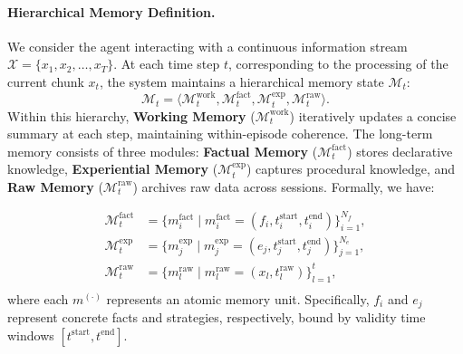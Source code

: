 \documentclass[11pt, a4paper]{lumia}
\begin{document}
\paragraph{Hierarchical Memory Definition.}
We consider the agent interacting with a continuous information stream $\mathcal{X} = \{x_1, x_2, \dots, x_T\}$. 
At each time step $t$, corresponding to the processing of the current chunk $x_t$, the system maintains a hierarchical memory state $\mathcal{M}_t$:
\begin{equation}
\mathcal{M}_t = \langle \mathcal{M}^{\text{work}}_t, \mathcal{M}^{\text{fact}}_t, \mathcal{M}^{\text{exp}}_t,  \mathcal{M}^{\text{raw}}_t\rangle.
\end{equation}
Within this hierarchy, \textbf{Working Memory} ($\mathcal{M}^{\text{work}}_t$) iteratively updates a concise summary at each step, maintaining within-episode coherence.
The long-term memory consists of three modules: \textbf{Factual Memory} ($\mathcal{M}^{\text{fact}}_t$) stores declarative knowledge, \textbf{Experiential Memory} ($\mathcal{M}^{\text{exp}}_t$) captures procedural knowledge, and \textbf{Raw Memory} ($\mathcal{M}^{\text{raw}}_t$) archives raw data across sessions. Formally, we have:

\begin{equation}
\begin{aligned}
    \mathcal{M}^{\text{fact}}_t &= \{ m^{\text{fact}}_i \mid m^{\text{fact}}_i = (f_i, t^{\text{start}}_i, t^{\text{end}}_i) \}_{i=1}^{N_f}, \\
    \mathcal{M}^{\text{exp}}_t &= \{ m^{\text{exp}}_j \mid m^{\text{exp}}_j = (e_j, t^{\text{start}}_j, t^{\text{end}}_j) \}_{j=1}^{N_e}, \\
    \mathcal{M}^{\text{raw}}_t &= \{ m^{\text{raw}}_l \mid m^{\text{raw}}_l = (x_l, t^{\text{raw}}_l) \}_{l=1}^{t}, \\
\end{aligned}
\end{equation}
where each $m^{(\cdot)}$ represents an atomic memory unit. Specifically, $f_i$ and $e_j$ represent concrete facts and strategies, respectively, bound by validity time windows $[t^{\text{start}}, t^{\text{end}}]$. 
\vspace{-0.5em}
\end{document}
